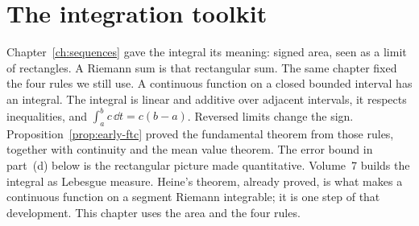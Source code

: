 \section{The integration toolkit}

Chapter~\ref{ch:sequences} gave the integral its meaning: signed area, seen as a limit of rectangles. A Riemann sum is that rectangular sum. The same chapter fixed the four rules we still use. A continuous function on a closed bounded interval has an integral. The integral is linear and additive over adjacent intervals, it respects inequalities, and $\int_a^b c\,\dd t=c(b-a)$. Reversed limits change the sign. Proposition~\ref{prop:early-ftc} proved the fundamental theorem from those rules, together with continuity and the mean value theorem. The error bound in part~(d) below is the rectangular picture made quantitative. Volume~7 builds the integral as Lebesgue measure. Heine's theorem, already proved, is what makes a continuous function on a segment Riemann integrable; it is one step of that development. This chapter uses the area and the four rules.

